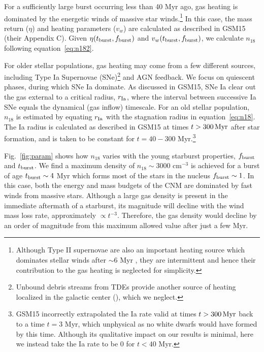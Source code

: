 \documentclass[usenatbib,fleqn]{mnras}
\newcommand{\Msun}{{\rm M_\odot}}
\begin{document}
For a sufficiently large burst occurring less than 40 Myr ago, gas
heating is dominated by the energetic winds of massive star
winds.\footnote{Although Type II supernovae are also an important heating
  source which dominates stellar winds after $\sim$6 Myr
  \citep{Voss+2009}, they are intermittent and hence their
  contribution to the gas heating is neglected for simplicity.}  In
this case, the mass return ($\eta$) and heating parameters ($v_w$) are
calculated as described in GSM15 (their Appendix C).  Given
$\eta(t_{\rm burst},f_{\rm burst})$ and $v_w(t_{\rm burst},f_{\rm
  burst})$, we calculate $n_{18}$ following equation~\eqref{eq:n182}.

For older stellar populations, gas heating may come from a few
different sources, including Type Ia Supernovae (SNe)\footnote{Unbound
  debris streams from TDEs provide another source of heating localized
  in the galactic center (\citealt{Guillochon+2015a}), which we
  neglect.} and AGN feedback.  We focus on
quiescent phases, during which SNe Ia dominate.  As discussed in
GSM15, SNe Ia clear out the gas external to a critical radius, $r_{\rm
  Ia}$, where the interval between successive Ia SNe equals the
dynamical (gas inflow) timescale.  For an old stellar population,
$n_{18}$ is estimated by equating $r_{\rm Ia}$ with the stagnation
radius in equation~\eqref{eq:n18}.  The Ia radius is calculated as
described in GSM15 at times $t>300 \,{\rm Myr}$ after star formation,
and is taken to be constant for $t = 40-300$ Myr.\footnote{GSM15
  incorrectly extrapolated the Ia rate valid at times $t>300 \,{\rm
    Myr}$ back to a time $t = 3$ Myr, which unphysical as no white
  dwarfs would have formed by this time.  Although its qualitative
  impact on our results is minimal, here we instead take the Ia rate
  to be 0 for $ t < 40$ Myr.}


Fig.~\ref{fig:param} shows how $n_{18}$ varies with the young
starburst properties, $f_{\rm burst}$ and $t_{\rm burst}$.  We find a
maximum density of $n_{18} \sim 3000$ cm$^{-3}$ is achieved for a
burst of age $t_{\rm burst} \sim 4$ Myr which forms most of the stars
in the nucleus $f_{\rm burst} \sim 1$.  In this case, both the energy
and mass budgets of the CNM are dominated by fast winds from massive
stars.  Although a large gas density is present in the immediate
aftermath of a starburst, its magnitude will decline with the wind
mass loss rate, approximately $\propto t^{-3}$.  Therefore, the gas
density would decline by an order of magnitude from this maximum
allowed value after just a few Myr.
\end{document}

